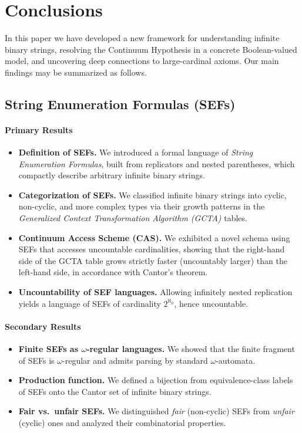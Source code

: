 \section{Conclusions}

In this paper we have developed a new framework for understanding infinite binary strings, resolving the Continuum Hypothesis in a concrete Boolean-valued model, and uncovering deep connections to large-cardinal axioms. Our main findings may be summarized as follows.

\subsection*{String Enumeration Formulas (SEFs)}
\paragraph{Primary Results}
\begin{itemize}
  \item \textbf{Definition of SEFs.}  We introduced a formal language of \emph{String Enumeration Formulas}, built from replicators and nested parentheses, which compactly describe arbitrary infinite binary strings.  
  \item \textbf{Categorization of SEFs.}  We classified infinite binary strings into cyclic, non-cyclic, and more complex types via their growth patterns in the \emph{Generalized Context Transformation Algorithm (GCTA)} tables.  
  \item \textbf{Continuum Access Scheme (CAS).}  We exhibited a novel schema using SEFs that accesses uncountable cardinalities, showing that the right-hand side of the GCTA table grows strictly faster (uncountably larger) than the left-hand side, in accordance with Cantor’s theorem.  
  \item \textbf{Uncountability of SEF languages.}  Allowing infinitely nested replication yields a language of SEFs of cardinality $2^{\aleph_0}$, hence uncountable.  
\end{itemize}

\paragraph{Secondary Results}
\begin{itemize}
  \item \textbf{Finite SEFs as $\omega$-regular languages.}  We showed that the finite fragment of SEFs is $\omega$-regular and admits parsing by standard $\omega$-automata.  
  \item \textbf{Production function.}  We defined a bijection from equivalence-class labels of SEFs onto the Cantor set of infinite binary strings.  
  \item \textbf{Fair vs.\ unfair SEFs.}  We distinguished \emph{fair} (non-cyclic) SEFs from \emph{unfair} (cyclic) ones and analyzed their combinatorial properties.  
\end{itemize}

